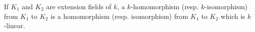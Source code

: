 If $K_1$ and $K_2$ are extension fields of $k$, a $k$-homomorphism (resp. $k$-isomorphism) from $K_1$ to $K_2$ is a homomorphism (resp. isomorphism) from $K_1$ to $K_2$ which is $k$-linear.
